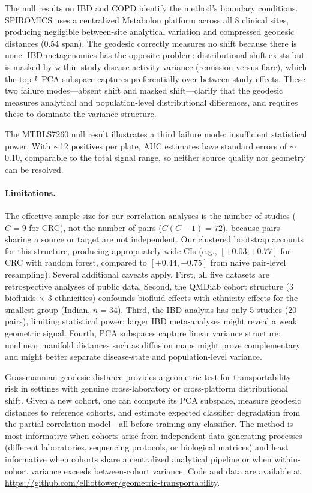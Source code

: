 \documentclass{article}
\begin{document}
The null results on IBD and COPD identify the method's boundary conditions. SPIROMICS uses a centralized Metabolon platform across all 8 clinical sites, producing negligible between-site analytical variation and compressed geodesic distances (0.54 span). The geodesic correctly measures no shift because there is none. IBD metagenomics has the opposite problem: distributional shift exists but is masked by within-study disease-activity variance (remission versus flare), which the top-$k$ PCA subspace captures preferentially over between-study effects. These two failure modes---absent shift and masked shift---clarify that the geodesic measures analytical and population-level distributional differences, and requires these to dominate the variance structure.

The MTBLS7260 null result illustrates a third failure mode: insufficient statistical power. With $\sim$12 positives per plate, AUC estimates have standard errors of $\sim$0.10, comparable to the total signal range, so neither source quality nor geometry can be resolved.

\paragraph{Limitations.} The effective sample size for our correlation analyses is the number of studies ($C = 9$ for CRC), not the number of pairs ($C(C-1) = 72$), because pairs sharing a source or target are not independent. Our clustered bootstrap accounts for this structure, producing appropriately wide CIs (e.g., $[+0.03, +0.77]$ for CRC with random forest, compared to $[+0.44, +0.75]$ from naive pair-level resampling). Several additional caveats apply. First, all five datasets are retrospective analyses of public data. Second, the QMDiab cohort structure (3 biofluids $\times$ 3 ethnicities) confounds biofluid effects with ethnicity effects for the smallest group (Indian, $n = 34$). Third, the IBD analysis has only 5 studies (20 pairs), limiting statistical power; larger IBD meta-analyses might reveal a weak geometric signal. Fourth, PCA subspaces capture linear variance structure; nonlinear manifold distances such as diffusion maps \citep{conway1996functions} might prove complementary and might better separate disease-state and population-level variance.

Grassmannian geodesic distance provides a geometric test for transportability risk in settings with genuine cross-laboratory or cross-platform distributional shift. Given a new cohort, one can compute its PCA subspace, measure geodesic distances to reference cohorts, and estimate expected classifier degradation from the partial-correlation model---all before training any classifier. The method is most informative when cohorts arise from independent data-generating processes (different laboratories, sequencing protocols, or biological matrices) and least informative when cohorts share a centralized analytical pipeline or when within-cohort variance exceeds between-cohort variance. Code and data are available at \url{https://github.com/elliottower/geometric-transportability}.



\end{document}
